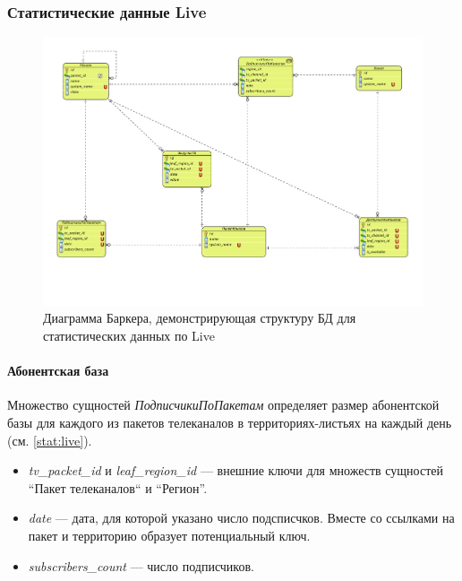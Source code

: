 \subsubsection{Статистические данные Live}
\begin{figure}[!ht]
\begin{center}
\vspace{-0.5cm}
\includegraphics[scale=0.65, trim=10mm 30mm 0mm 10mm, clip]{../resources/uml/TV_STAT.pdf}
\caption{Диаграмма Баркера, демонстрирующая структуру БД для статистических данных по Live}
\label{gr:tv_stat}
\end{center} 
\end{figure}

\paragraph{Абонентская база} Множество сущностей \textit{ПодписчикиПоПакетам} определяет размер
абонентской базы для каждого из пакетов телеканалов в территориях-листьях на каждый день (см. \ref{stat:live}).
\begin{itemize}
\item{
  \textit{tv\_packet\_id} и \textit{leaf\_region\_id} --- внешние ключи для множеств сущностей ``Пакет телеканалов`` и
  ``Регион''.
}
\item{
  \textit{date} --- дата, для которой указано число подсписчков. Вместе со ссылками на пакет и территорию
образует потенциальный ключ.
}
\item{
  \textit{subscribers\_count} --- число подписчиков. 
}
\end{itemize}

